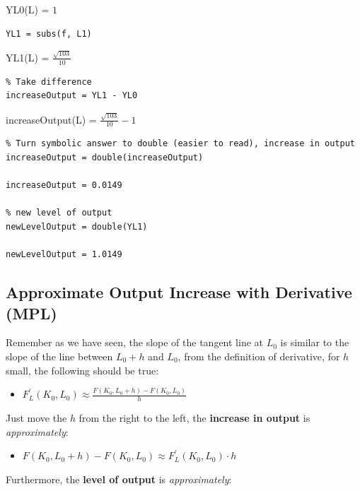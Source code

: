 \documentclass[
]{book}
\providecommand{\tightlist}{%
  \setlength{\itemsep}{0pt}\setlength{\parskip}{0pt}}
\begin{document}
YL0(L) = \(\displaystyle 1\)

\begin{verbatim}
YL1 = subs(f, L1)
\end{verbatim}

YL1(L) = \(\displaystyle \frac{\sqrt{103}}{10}\)

\begin{verbatim}
% Take difference
increaseOutput = YL1 - YL0
\end{verbatim}

increaseOutput(L) = \(\displaystyle \frac{\sqrt{103}}{10}-1\)

\begin{verbatim}
% Turn symbolic answer to double (easier to read), increase in output
increaseOutput = double(increaseOutput)

increaseOutput = 0.0149

% new level of output
newLevelOutput = double(YL1)

newLevelOutput = 1.0149
\end{verbatim}

\hypertarget{approximate-output-increase-with-derivative-mpl}{%
\subsection{\texorpdfstring{\textbf{Approximate Output Increase with Derivative (MPL)}}{Approximate Output Increase with Derivative (MPL)}}\label{approximate-output-increase-with-derivative-mpl}}

Remember as we have seen, the slope of the tangent line at \(L_0\) is
similar to the slope of the line between \(L_0 +h\) and \(L_0\), from the
definition of derivative, for \(h\) small, the following should be true:

\begin{itemize}
\tightlist
\item
  \(\displaystyle F_L^{\prime } (K_0 ,L_0 )\approx \frac{F(K_0 ,L_0 +h)-F(K_0 ,L_0 )}{h}\)
\end{itemize}

Just move the \(h\) from the right to the left, the \textbf{increase in output}
is \emph{approximately}:

\begin{itemize}
\tightlist
\item
  \(\displaystyle F(K_0 ,L_0 +h)-F(K_0 ,L_0 )\approx F_L^{\prime } (K_0 ,L_0 )\cdot h\)
\end{itemize}

Furthermore, the \textbf{level of output} is \emph{approximately}:
\end{document}
